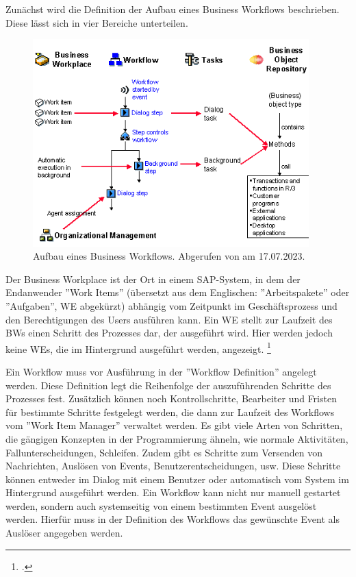Zunächst wird die Definition der Aufbau eines Business Workflows beschrieben. Diese lässt sich in vier Bereiche unterteilen.

\begin{figure}[H]
 \centering
 \includegraphics[height=8cm]{Bilder/Business-Workflows_Schema.png}
 \caption[Aufbau eines Business Workflows]{Aufbau eines Business Workflows. Abgerufen von \cite{sap_business-workflows_2022-1} am 17.07.2023.}
 \label{fig:iso_norm}
\end{figure}

Der Business Workplace ist der Ort in einem SAP-System, in dem der Endanwender ''Work Items'' (übersetzt aus dem Englischen: ''Arbeitspakete'' oder ''Aufgaben'', WE abgekürzt) abhängig vom Zeitpunkt im Geschäftsprozess und den Berechtigungen des Users ausführen kann. Ein WE stellt zur Laufzeit des BWs einen Schritt des Prozesses dar, der ausgeführt wird. Hier werden jedoch keine WEs, die im Hintergrund ausgeführt werden, angezeigt. \footcite[Vgl.][]{sap_business-workflows_2022-1}

Ein Workflow muss vor Ausführung in der ''Workflow Definition'' angelegt werden. Diese Definition legt die Reihenfolge der auszuführenden Schritte des Prozesses fest. Zusätzlich können noch Kontrollschritte, Bearbeiter und Fristen für bestimmte Schritte festgelegt werden, die dann zur Laufzeit des Workflows vom ''Work Item Manager'' verwaltet werden. Es gibt viele Arten von Schritten, die gängigen Konzepten in der Programmierung ähneln, wie \zB normale Aktivitäten, Fallunterscheidungen, Schleifen. Zudem gibt es Schritte zum Versenden von Nachrichten, Auslösen von Events, Benutzerentscheidungen, usw. Diese Schritte können entweder im Dialog mit einem Benutzer oder automatisch vom System im Hintergrund ausgeführt werden. Ein Workflow kann nicht nur manuell gestartet werden, sondern auch systemseitig von einem bestimmten Event ausgelöst werden. Hierfür muss in der Definition des Workflows das gewünschte Event als Auslöser angegeben werden.

